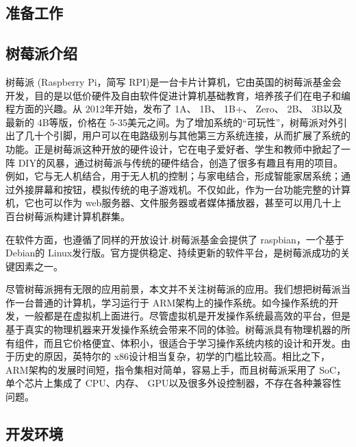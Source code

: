 \documentclass[main.tex]{subfiles}
\begin{document}
\ifxetex\else\begin{CJK*}{UTF8}{song}\fi

\chapter{准备工作}
\section{树莓派介绍}

\par
树莓派 (Raspberry Pi，简写 RPI)是一台卡片计算机，它由英国的树莓派基金会开发，目的是以低价硬件及自由软件促进计算机基础教育，培养孩子们在电子和编程方面的兴趣。从 2012年开始，发布了 1A、 1B、 1B\-+、 Zero、 2B、 3B以及最新的 4B等版，价格在 5-35美元之间。为了增加系统的“可玩性”，树莓派对外引出了几十个引脚，用户可以在电路级别与其他第三方系统连接，从而扩展了系统的功能。正是树莓派这种开放的硬件设计，它在电子爱好者、学生和教师中掀起了一阵 DIY的风暴，通过树莓派与传统的硬件结合，创造了很多有趣且有用的项目。例如，它与无人机结合，用于无人机的控制；与家电结合，形成智能家居系统；通过外接屏幕和按钮，模拟传统的电子游戏机。不仅如此，作为一台功能完整的计算机，它也可以作为 web服务器、文件服务器或者媒体播放器，甚至可以用几十上百台树莓派构建计算机群集。

\par
在软件方面，也遵循了同样的开放设计.树莓派基金会提供了 raspbian，一个基于 Debian的 Linux发行版。官方提供稳定、持续更新的软件平台，是树莓派成功的关键因素之一。

\par
尽管树莓派拥有无限的应用前景，本文并不关注树莓派的应用。我们想把树莓派当作一台普通的计算机，学习运行于 ARM架构上的操作系统。如今操作系统的开发，一般都是在虚拟机上面进行。尽管虚拟机是开发操作系统最高效的平台，但是基于真实的物理机器来开发操作系统会带来不同的体验。树莓派具有物理机器的所有组件，而且它价格便宜、体积小，很适合于学习操作系统内核的设计和开发。由于历史的原因，英特尔的 x86设计相当复杂，初学的门槛比较高。相比之下， ARM架构的发展时间短，指令集相对简单，容易上手，而且树莓派采用了 SoC，单个芯片上集成了 CPU、内存、 GPU以及很多外设控制器，不存在各种兼容性问题。

\section{开发环境}


\end{CJK*}
\end{document}
